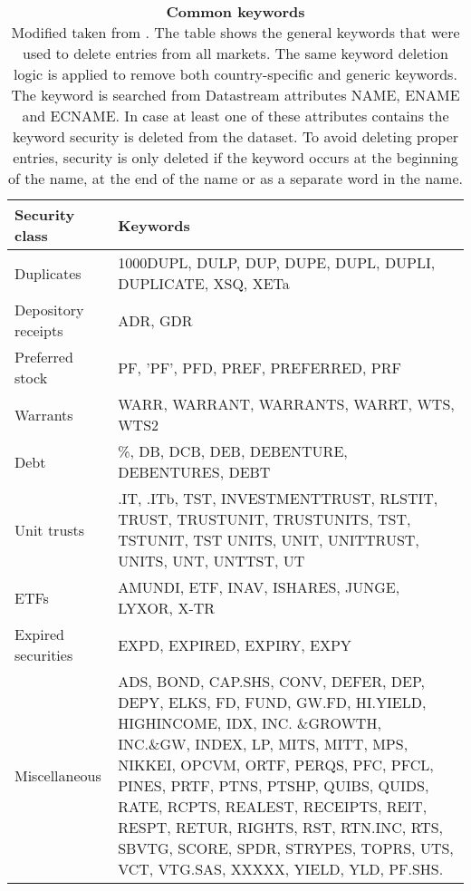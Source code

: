\documentclass[12pt]{article}
\begin{document}
\begin{appendices}
\begin{table}[H] 
\footnotesize
\caption[Common keywords]{\textbf{Common keywords}\\ Modified taken from \protect\citet{HANAUER2023106712}. The table shows the general keywords that were used to delete entries from all markets. The same keyword deletion logic is applied to remove both country-specific and generic keywords. The keyword is searched from Datastream attributes NAME, ENAME and ECNAME. In case at least one of these attributes contains the keyword security is deleted from the dataset. To avoid deleting proper entries, security is only deleted if the keyword occurs at the beginning of the name, at the end of the name or as a separate word in the name.}
 \label{table:GeneralKeywords}
\centering
\begin{tabularx}{\textwidth}{l X}
\toprule
Security class 	& Keywords \\
\midrule
Duplicates 		& 1000DUPL, DULP, DUP, DUPE, DUPL, DUPLI, DUPLICATE, XSQ, XETa  \\[1ex]
Depository receipts	& ADR, GDR \\[1ex]
Preferred stock 	&  PF, ’PF’, PFD, PREF, PREFERRED, PRF\\ [1ex]
Warrants 			&  WARR, WARRANT, WARRANTS, WARRT, WTS, WTS2\\[1ex]
Debt 			& \%, DB, DCB, DEB, DEBENTURE, DEBENTURES, DEBT\\[1ex]
Unit trusts 		& .IT, .ITb, TST, INVESTMENTTRUST, RLSTIT, TRUST, TRUSTUNIT, TRUSTUNITS, TST, TSTUNIT, TST UNITS, UNIT, UNITTRUST, UNITS, UNT, UNTTST, UT\\[1ex]
ETFs 			& AMUNDI, ETF, INAV, ISHARES, JUNGE, LYXOR, X-TR\\[1ex]
Expired securities 	& EXPD, EXPIRED, EXPIRY, EXPY\\[1ex]
Miscellaneous 		& ADS, BOND, CAP.SHS, CONV, DEFER, DEP, DEPY, ELKS, FD, FUND, GW.FD, HI.YIELD, HIGHINCOME, IDX, INC.								\&GROWTH, INC.\&GW, INDEX, LP, MITS, MITT, MPS, NIKKEI, OPCVM, ORTF, PERQS, 												PFC, PFCL, PINES, PRTF, PTNS, PTSHP, QUIBS, QUIDS, RATE, RCPTS, REALEST, RECEIPTS, REIT, RESPT, 								RETUR, RIGHTS, RST, RTN.INC, RTS, SBVTG, SCORE, SPDR, STRYPES, TOPRS, UTS, VCT, VTG.SAS, 									XXXXX, YIELD, YLD, PF.SHS.\\
\bottomrule
\end{tabularx}
\end{table} 


\end{appendices}
\end{document}
